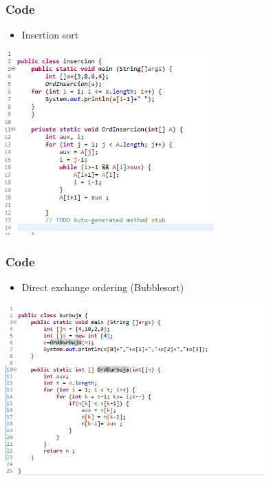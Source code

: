 \documentclass[11pt]{beamer}
\begin{document}
\begin{frame}
\frametitle{Code}
\begin{itemize}
\item Insertion sort
\end{itemize}
\begin{center}
\includegraphics[width=8.0cm]{img/insercion (2).png}
\end{center}
\end{frame}

\begin{frame}
\frametitle{Code}
\begin{itemize}
\item Direct exchange ordering (Bubblesort)
\end{itemize}
\begin{center}
\includegraphics[width=10.0cm]{img/Met burbuja (2).png}
\end{center}
\end{frame}
\end{document}
